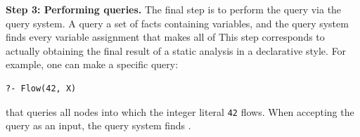 \smallskip
\textbf{Step 3: Performing queries.}
The final step is to perform the query via the query system.  A query 
a set of facts containing variables, and the query system finds every variable
assignment that makes all of 
This step corresponds to actually obtaining the
final result of a static analysis in a declarative style.
For example, one can make a specific query:

\begin{lstlisting}[style=mrule]
?- Flow(42, X)
\end{lstlisting}

\noindent
that queries all nodes into which the integer literal {\tt 42} flows.
When accepting the query as an input, the query system finds 
.

